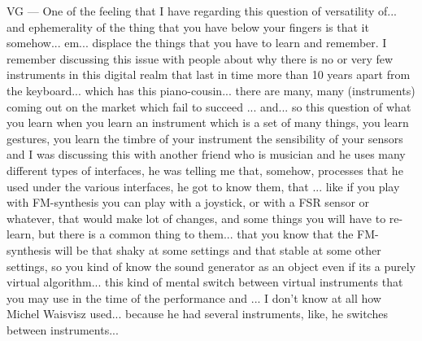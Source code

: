 VG — One of the feeling that I have regarding  this question of versatility of... and ephemerality of the thing that you have below your fingers is that it somehow... em... displace the things that you have  to learn and remember. I remember discussing this issue with people about why there is no or very few instruments in this digital realm that last in time more than 10 years apart from the keyboard... which has this piano-cousin... there are many, many (instruments) coming out on the market which fail to succeed ... and... so this question of what you learn when you learn  an instrument which is a set of many things, you learn gestures, you learn the timbre of your instrument the sensibility of your sensors and I was discussing this with another friend who is musician and he uses many different types of interfaces, he was telling me that, somehow, processes that he used under the various interfaces, he got to know them, that ... like if you play with FM-synthesis you can play with a joystick, or with a FSR sensor or whatever, that would make lot of changes,  and some things you will have to re-learn, but there is a common thing to them... that you know that the FM-synthesis will be that shaky at some settings and that stable at some other settings, so you kind of know the sound  generator as an object even if its a purely virtual algorithm... this kind of mental switch  between virtual instruments that you may use in the time of the performance and ... I don't know at all how Michel Waisvisz used... because he had several instruments, like, he switches between instruments... 

